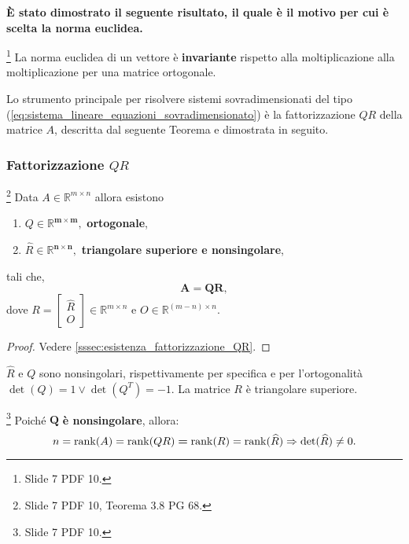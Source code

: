 \textbf{È stato dimostrato il seguente risultato, il quale è il motivo per cui è scelta la norma euclidea.}

\begin{theorem}\footnote{Slide 7 PDF 10.}
    La norma euclidea di un vettore è \textbf{invariante} rispetto alla moltiplicazione alla moltiplicazione per una matrice ortogonale.
\end{theorem}

Lo strumento principale per risolvere sistemi sovradimensionati del tipo (\ref{eq:sistema_lineare_equazioni_sovradimensionato}) è la fattorizzazione $QR$ della matrice $A$, descritta dal seguente Teorema e dimostrata in seguito.

\subsubsection{Fattorizzazione \texorpdfstring{$QR$}{QR}}
\begin{theorem}\label{th:esistenza_fattorizzazione_QR}\footnote{Slide 7 PDF 10, Teorema 3.8 PG 68.}
    Data $A\in\mathbb R^{m\times n}$ allora esistono
    \begin{enumerate}
        \item $Q\in\mathbb R^{\boldsymbol{m\times m}},$ \textbf{ortogonale},
        \item $\widehat R\in\mathbb R^{\boldsymbol{n\times n}},$ \textbf{triangolare superiore e \gls{nonsingolare}},
    \end{enumerate}
    tali che,
    \begin{equation}\label{eq:fattorizzazione_QR}
        \boldsymbol{A=QR},
    \end{equation}
    dove $R =
    \begin{bmatrix}
    	\widehat R\\
    	O
    \end{bmatrix}\in \mathbb R^{m\times n}$ e $O\in\mathbb R^{(m-n)\times n}$.
\end{theorem}
\begin{proof}
	Vedere \ref{sssec:esistenza_fattorizzazione_QR}.
\end{proof}

$\widehat R$ e $Q$ sono nonsingolari, rispettivamente per specifica e per l'ortogonalità $\det(Q)=1\vee \det(Q^T)=-1$. La matrice $R$ è triangolare superiore.

\begin{remark}\label{rem:fattorizzazione_QR_nonsingolare}\footnote{Slide 7 PDF 10.}
    Poiché $\boldsymbol Q$ \textbf{è \gls{nonsingolare}}, allora:
    \begin{equation*}
        n = \operatorname{rank}(A) = \operatorname{rank} (QR) \boldsymbol = \operatorname{rank}(R) = \operatorname{rank}(\widehat R)\Rightarrow \det(\widehat R)\neq 0.
    \end{equation*}
\end{remark}

